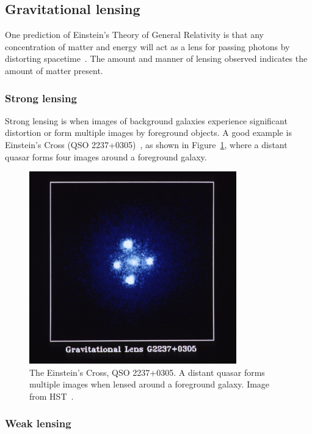 \subsection{Gravitational lensing}

One prediction of Einstein's Theory of General Relativity is that any concentration of matter and energy will act as a lens for passing photons by distorting spacetime~\cite{Einstein:1936}. The amount and manner of lensing observed indicates the amount of matter present.

\subsubsection{Strong lensing}

Strong lensing is when images of background galaxies experience significant distortion or form multiple images by foreground objects. A good example is Einstein's Cross (QSO 2237+0305)~\cite{einstein_cross}, as shown in Figure~\ref{fig:einstein_cross}, where a distant quasar forms four images around a foreground galaxy.

\begin{figure}[htb]
    \centering
    \includegraphics[width=0.8\textwidth]{figures/dm/einstein_cross}
    \caption{The Einstein's Cross, QSO 2237+0305. A distant quasar forms multiple images when lensed around a foreground galaxy. Image from HST~\cite{einstein_cross}.}\label{fig:einstein_cross}
\end{figure}

\subsubsection{Weak lensing}

